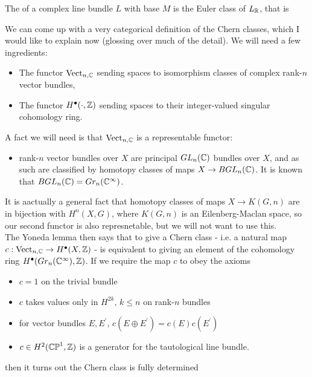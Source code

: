 \documentclass{article}
\begin{document}
\begin{definition}
	The  of a complex line bundle $L$ with base $M$ is the Euler class of $L_{\mathbb{R}}$, that is 
\end{definition}

\begin{remark}
	We can come up with a very categorical definition of the Chern classes, which I would like to explain now (glossing over much of the detail). We will need a few ingredients:
	\begin{itemize}
		\item The functor $\operatorname{Vect}_{n,\mathbb{C}}$ sending spaces to isomorphism classes of complex rank-$n$ vector bundles,
		\item The functor $H^\bullet(\cdot, \mathbb{Z})$ sending spaces to their integer-valued singular cohomology ring.
	\end{itemize}
A fact we will need is that $\operatorname{Vect}_{n,\mathbb{C}}$ is a representable functor:
\begin{itemize}
	\item rank-$n$ vector bundles over $X$ are principal $GL_n(\mathbb{C})$ bundles over $X$, and as such are classified by homotopy classes of maps $X \to BGL_n(\mathbb{C})$. It is known that $BGL_n(\mathbb{C}) = Gr_n(\mathbb{C}^\infty)$.
\end{itemize}
It is aactually a  general fact that homotopy classes of maps $X\to K(G,n)$ are in bijection with $H^n(X,G)$, where $K(G,n)$ is an Eilenberg-Maclan space, so our second functor is also represnetable, but we will not want to use this. \\
The Yoneda lemma then says that to give a Chern class - i.e. a natural map $c : \operatorname{Vect}_{n,\mathbb{C}} \to H^\bullet(X,\mathbb{Z})$ - is equivalent to giving an element of the cohomology ring $H^\bullet(Gr_n(\mathbb{C}^\infty),\mathbb{Z})$. If we require the map $c$ to obey the axioms
\begin{itemize}
	\item $c=1$ on the trivial bundle 
	\item $c$ takes values only in $H^{2k}, \, k \leq n$ on rank-$n$ bundles
	\item for vector bundles $E,E^\prime$, $c(E \oplus E^\prime) = c(E)c(E^\prime)$
	\item $c \in H^2(\mathbb{CP}^1,\mathbb{Z})$ is a generator for the tautological line bundle. 
\end{itemize}
then it turns out the Chern class is fully determined
\end{remark}
\end{document}
